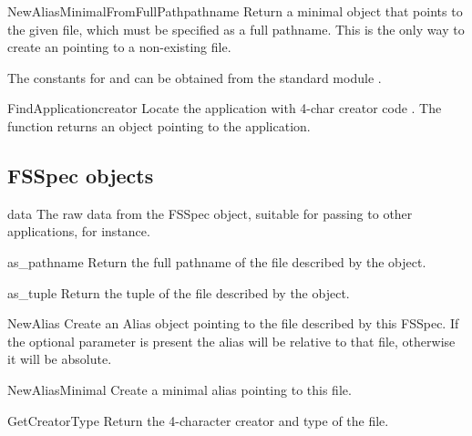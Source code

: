 \begin{funcdesc}{NewAliasMinimalFromFullPath}{pathname}
Return a minimal  object that points to the given file, which
must be specified as a full pathname. This is the only way to create an
 pointing to a non-existing file.

The constants for  and  can be obtained from the
standard module .
\end{funcdesc}

\begin{funcdesc}{FindApplication}{creator}
Locate the application with 4-char creator code . The
function returns an  object pointing to the application.
\end{funcdesc}

\subsection{FSSpec objects}
\label{fsspec-objects}

\begin{memberdesc}[FSSpec]{data}
The raw data from the FSSpec object, suitable for passing
to other applications, for instance.
\end{memberdesc}

\begin{methoddesc}[FSSpec]{as_pathname}{}
Return the full pathname of the file described by the 
object.
\end{methoddesc}

\begin{methoddesc}[FSSpec]{as_tuple}{}
Return the  tuple of
the file described by the  object.
\end{methoddesc}

\begin{methoddesc}[FSSpec]{NewAlias}{}
Create an Alias object pointing to the file described by this
FSSpec. If the optional  parameter is present the alias
will be relative to that file, otherwise it will be absolute.
\end{methoddesc}

\begin{methoddesc}[FSSpec]{NewAliasMinimal}{}
Create a minimal alias pointing to this file.
\end{methoddesc}

\begin{methoddesc}[FSSpec]{GetCreatorType}{}
Return the 4-character creator and type of the file.
\end{methoddesc}

